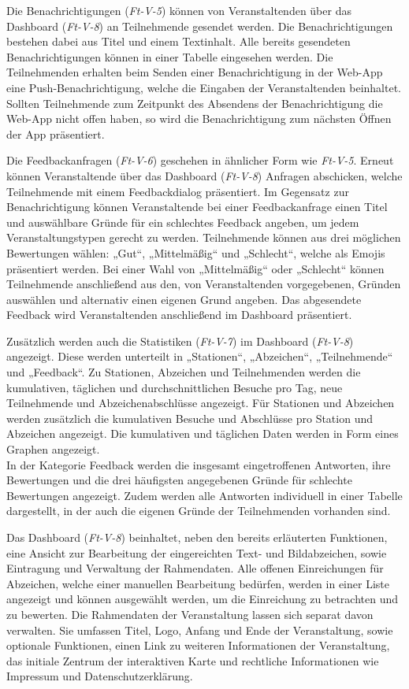 Die Benachrichtigungen (\textit{Ft-V-5}) können von Veranstaltenden über das
Dashboard (\textit{Ft-V-8}) an Teilnehmende gesendet werden. Die
Benachrichtigungen bestehen dabei aus Titel und einem Textinhalt. Alle bereits
gesendeten Benachrichtigungen können in einer Tabelle eingesehen werden. Die
Teilnehmenden erhalten beim Senden einer Benachrichtigung in der Web-App eine
Push-Benachrichtigung, welche die Eingaben der Veranstaltenden beinhaltet.
Sollten Teilnehmende zum Zeitpunkt des Absendens der Benachrichtigung die
Web-App nicht offen haben, so wird die Benachrichtigung zum nächsten Öffnen der
App präsentiert.

Die Feedbackanfragen (\textit{Ft-V-6}) geschehen in ähnlicher Form wie
\textit{Ft-V-5}. Erneut können Veranstaltende über das Dashboard
(\textit{Ft-V-8}) Anfragen abschicken, welche Teilnehmende mit einem
Feedbackdialog präsentiert. Im Gegensatz zur Benachrichtigung können
Veranstaltende bei einer Feedbackanfrage einen Titel und auswählbare Gründe für
ein schlechtes Feedback angeben, um jedem Veranstaltungstypen gerecht zu werden.
Teilnehmende können aus drei möglichen Bewertungen wählen: „Gut“, „Mittelmäßig“
und „Schlecht“, welche als Emojis präsentiert werden. Bei einer Wahl von
„Mittelmäßig“ oder „Schlecht“ können Teilnehmende anschließend aus den, von
Veranstaltenden vorgegebenen, Gründen auswählen und alternativ einen eigenen
Grund angeben. Das abgesendete Feedback wird Veranstaltenden anschließend im
Dashboard präsentiert.

Zusätzlich werden auch die Statistiken (\textit{Ft-V-7}) im Dashboard
(\textit{Ft-V-8}) angezeigt. Diese werden unterteilt in „Stationen“,
„Abzeichen“, „Teilnehmende“ und „Feedback“. Zu Stationen, Abzeichen und
Teilnehmenden werden die kumulativen, täglichen und durchschnittlichen Besuche
pro Tag, neue Teilnehmende und Abzeichenabschlüsse angezeigt. Für Stationen und
Abzeichen werden zusätzlich die kumulativen Besuche und Abschlüsse pro Station
und Abzeichen angezeigt. Die kumulativen und täglichen Daten werden in Form
eines Graphen angezeigt. \\
In der Kategorie Feedback werden die insgesamt eingetroffenen Antworten, ihre
Bewertungen und die drei häufigsten angegebenen Gründe für schlechte Bewertungen
angezeigt. Zudem werden alle Antworten individuell in einer Tabelle dargestellt,
in der auch die eigenen Gründe der Teilnehmenden vorhanden sind.

Das Dashboard (\textit{Ft-V-8}) beinhaltet, neben den bereits erläuterten
Funktionen, eine Ansicht zur Bearbeitung der eingereichten Text- und
Bildabzeichen, sowie Eintragung und Verwaltung der Rahmendaten. Alle offenen
Einreichungen für Abzeichen, welche einer manuellen Bearbeitung bedürfen, werden
in einer Liste angezeigt und können ausgewählt werden, um die Einreichung zu
betrachten und zu bewerten. Die Rahmendaten der Veranstaltung lassen sich
separat davon verwalten. Sie umfassen Titel, Logo, Anfang und Ende der
Veranstaltung, sowie optionale Funktionen, einen Link zu weiteren Informationen
der Veranstaltung, das initiale Zentrum der interaktiven Karte und rechtliche
Informationen wie Impressum und Datenschutzerklärung.

